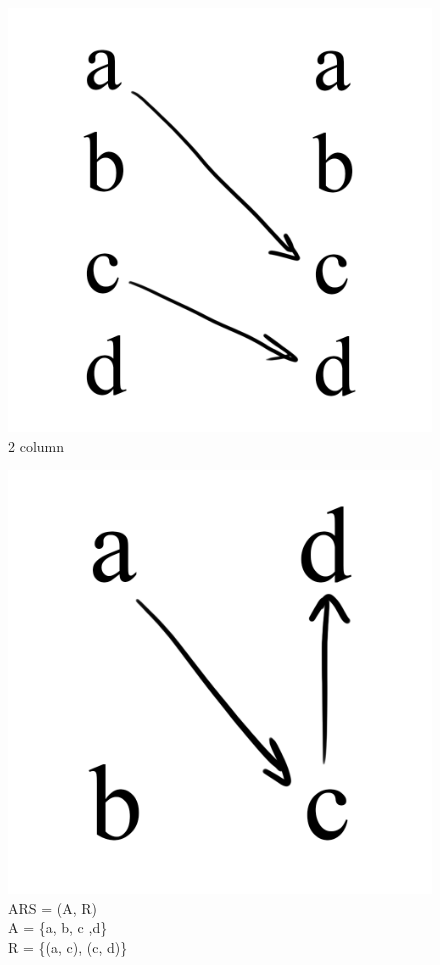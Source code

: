 \documentclass{article}
\begin{document}
{\begin{figure}[h!]
  \centering
  \includegraphics[scale=0.06]{s4}
  \caption[] {
     2 column
    \endtabular}
\end{figure}

\begin{figure}[h!]
  \centering
  \includegraphics[scale=0.06]{v4}
  \caption[] {
     ARS = (A, R) \\ A = \{a, b, c ,d\} \\ R = \{(a, c), (c, d)\}
    \endtabular}
\end{figure}

}
\end{document}
